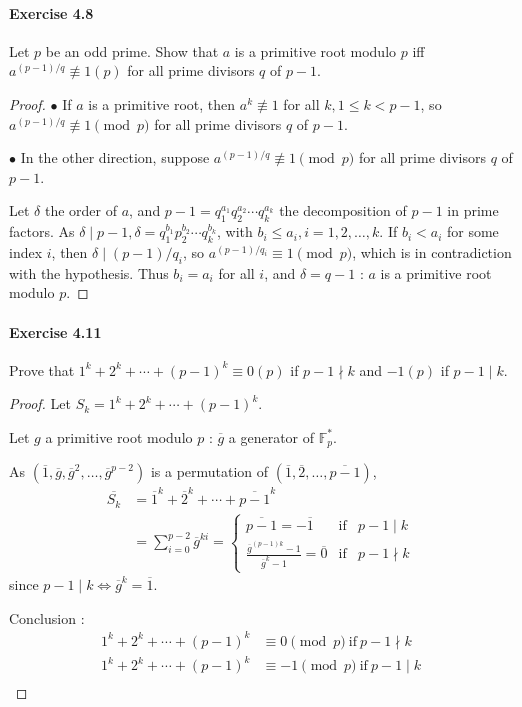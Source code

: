 \documentclass{article}
\begin{document}
\paragraph{Exercise 4.8} Let $p$ be an odd prime. Show that $a$ is a primitive root modulo $p$ iff $a^{(p-1) / q} \not \equiv 1(p)$ for all prime divisors $q$ of $p-1$.
\begin{proof}    
$\bullet$ If $a$ is a primitive root, then $a^k \not \equiv 1$ for all $k, 1\leq k < p-1$, so $a^{(p-1)/q} \not \equiv 1 \pmod p$ for all prime divisors $q$ of $p - 1$.

$\bullet$ In the other direction, suppose $a^{(p-1)/q} \not \equiv 1 \pmod p$ for all prime divisors $q$ of $p - 1$.

Let $\delta$ the order of $a$, and $p-1 = q_1^{a_1}q_2^{a_2}\cdots q_k^{a_k}$ the decomposition of $p-1$ in prime factors. As $\delta \mid p-1, \delta = q_1^{b_1}p_2^{b_2}\cdots q_k^{b_k}$, with $b_i \leq a_i, i=1,2,\ldots,k$. If $b_i < a_i$ for some index $i$, then $\delta \mid (p-1)/q_i$, so $a^{(p-1)/q_i} \equiv 1 \pmod p$, which is in contradiction with the hypothesis. Thus $b_i = a_i$ for all $i$, and $\delta = q-1$ : $a$ is a primitive root modulo $p$.
\end{proof}



\paragraph{Exercise 4.11} Prove that $1^{k}+2^{k}+\cdots+(p-1)^{k} \equiv 0(p)$ if $p-1 \nmid k$ and $-1(p)$ if $p-1 \mid k$.
\begin{proof}    
Let $S_k = 1^k+2^k+\cdots+(p-1)^k$.

Let $g$ a primitive root modulo $p$ : $\overline{g}$ a generator of $\mathbb{F}_p^*$.

As $(\overline{1},\overline{g},\overline{g}^{2}, \ldots, \overline{g}^{p-2}) $ is a permutation of $ (\overline{1},\overline{2}, \ldots,\overline{p-1})$,
\begin{align*}
\overline{S_k} &= \overline{1}^k + \overline{2}^k+\cdots+ \overline{p-1}^k\\
&= \sum_{i=0}^{p-2} \overline{g}^{ki} =
\left\{
\begin{array}{ccc}
\overline{ p-1} = -\overline{1} &  \mathrm{if} &  p-1 \mid k  \\
 \frac{ \overline{g}^{(p-1)k} -1}{ \overline{g}^k -1} = \overline{0}&  \mathrm{if}  &   p-1 \nmid k
\end{array}
\right.
\end{align*}
since $p-1 \mid k \iff \overline{g}^k = \overline{1}$.

Conclusion :
\begin{align*}
1^k+2^k+\cdots+(p-1)^k&\equiv 0 \pmod p\ \mathrm{if} \ p-1 \nmid k\\
1^k+2^k+\cdots+(p-1)^k&\equiv -1 \pmod p\ \mathrm{if} \ p-1 \mid k\\
\end{align*}
\end{proof}
\end{document}
